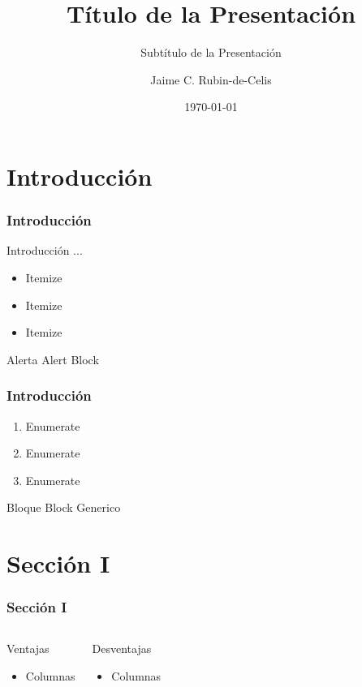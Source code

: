 \documentclass[
	9pt,
]{beamer}
\title{Título de la Presentación}
\subtitle{Subtítulo de la Presentación}
\author{Jaime C. Rubin-de-Celis}
\institute{Universidad Técnica Federico Santa María}
\date{\today}
\numberwithin{equation}{section}
\begin{document}
\frame{\titlepage}

\section{Introducción}

%
\begin{frame}
\frametitle{Introducción}

Introducción ...

\begin{itemize}
\item Itemize
\item Itemize
\item Itemize
\end{itemize}

\begin{alertblock}{Alerta}
\centering
Alert Block
\end{alertblock}

\end{frame}


%
\begin{frame}
\frametitle{Introducción}
\begin{enumerate}
\item Enumerate
\item Enumerate
\item Enumerate
\end{enumerate}

\begin{block}{Bloque}
\centering
Block Generico
\end{block}

\end{frame}


\section{Sección I}

%
\begin{frame}
\frametitle{Sección I}
\begin{columns}[t]
	\begin{block}{Ventajas}
	\begin{itemize}
	\item Columnas
	\end{itemize}
	\end{block}
	\begin{block}{Desventajas}
	\begin{itemize}
	\item Columnas
	\end{itemize}
	\end{block}
\end{columns}
\end{frame}
\end{document}
